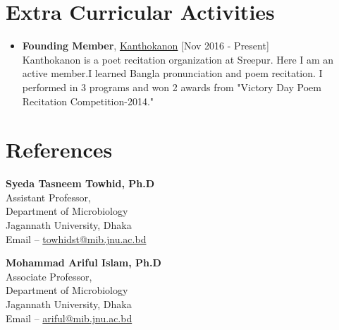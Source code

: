 \documentclass[11pt,a4paper]{moderncv}
\begin{document}
\section{Extra Curricular Activities}
\begin{itemize}
	\item \textbf{Founding Member}, 
	\textcolor{blue}{\href{}{Kanthokanon}}
	\hfill [Nov 2016 - Present]\\ 
	Kanthokanon is a poet recitation organization at Sreepur. Here I am an 
	active member.I learned Bangla pronunciation and poem recitation. I 
	performed in 3 programs and won 2 awards from "Victory Day Poem Recitation 
	Competition-2014."
\end{itemize}

	
\section{References}
\begin{multicols}{2}
\textbf{Syeda Tasneem Towhid, Ph.D}\\ 
Assistant Professor, \\ 
Department of Microbiology \\ 
Jagannath University, Dhaka \\ 
Email -- \textcolor{blue}{\url{towhidst@mib.jnu.ac.bd}} 

\columnbreak 
\textbf{Mohammad Ariful Islam, Ph.D}\\ 
Associate Professor,\\ 
Department of Microbiology \\ 
Jagannath University, Dhaka \\ 
Email -- \textcolor{blue}{\url{ariful@mib.jnu.ac.bd}}
\end{multicols} 
\end{document}
